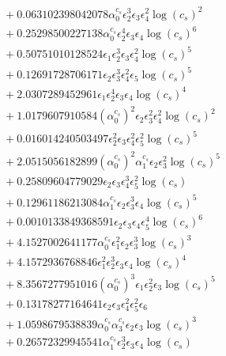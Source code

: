 \documentclass[10pt]{article}
\begin{document}
\begin{align*}
&{}  + 0.063102398042078 \alpha_{0}^{c_s} \epsilon_{2}^{3} \epsilon_{3} \epsilon_{4}^{2} \log{\left(c_{s} \right)}^{2} \\
&{}  + 0.25298500227138 \alpha_{0}^{c_s} \epsilon_{2}^{4} \epsilon_{3} \epsilon_{4} \log{\left(c_{s} \right)}^{6} \\
&{}  + 0.50751010128524 \epsilon_{1} \epsilon_{2}^{3} \epsilon_{3} \epsilon_{4}^{2} \log{\left(c_{s} \right)}^{5} \\
&{}  + 0.12691728706171 \epsilon_{2} \epsilon_{3}^{3} \epsilon_{4}^{2} \epsilon_{5} \log{\left(c_{s} \right)}^{5} \\
&{}  + 2.0307289452961 \epsilon_{1} \epsilon_{2}^{4} \epsilon_{3} \epsilon_{4} \log{\left(c_{s} \right)}^{4} \\
&{}  + 1.0179607910584 \left(\alpha_{0}^{c_s}\right)^{2} \epsilon_{2} \epsilon_{3}^{2} \epsilon_{4}^{2} \log{\left(c_{s} \right)}^{2} \\
&{}  + 0.016014240503497 \epsilon_{2}^{2} \epsilon_{3} \epsilon_{4}^{2} \epsilon_{5}^{2} \log{\left(c_{s} \right)}^{5} \\
&{}  + 2.0515056182899 \left(\alpha_{0}^{c_s}\right)^{2} \alpha_{1}^{c_s} \epsilon_{2} \epsilon_{3}^{2} \log{\left(c_{s} \right)}^{5} \\
&{}  + 0.25809604779029 \epsilon_{2} \epsilon_{3} \epsilon_{4}^{3} \epsilon_{5}^{2} \log{\left(c_{s} \right)} \\
&{}  + 0.12961186213084 \alpha_{1}^{c_s} \epsilon_{2} \epsilon_{3}^{3} \epsilon_{4} \log{\left(c_{s} \right)}^{5} \\
&{}  + 0.0010133849368591 \epsilon_{2} \epsilon_{3} \epsilon_{4} \epsilon_{5}^{4} \log{\left(c_{s} \right)}^{6} \\
&{}  + 4.1527002641177 \alpha_{0}^{c_s} \epsilon_{1}^{2} \epsilon_{2} \epsilon_{3}^{3} \log{\left(c_{s} \right)}^{3} \\
&{}  + 4.1572936768846 \epsilon_{1}^{2} \epsilon_{2}^{3} \epsilon_{3} \epsilon_{4} \log{\left(c_{s} \right)}^{4} \\
&{}  + 8.3567277951016 \left(\alpha_{0}^{c_s}\right)^{3} \epsilon_{1} \epsilon_{2}^{2} \epsilon_{3} \log{\left(c_{s} \right)}^{5} \\
&{}  + 0.13178277164641 \epsilon_{2} \epsilon_{3} \epsilon_{4}^{2} \epsilon_{5}^{2} \epsilon_{6} \\
&{}  + 1.0598679538839 \alpha_{0}^{c_s} \alpha_{3}^{c_s} \epsilon_{2} \epsilon_{3} \log{\left(c_{s} \right)}^{3} \\
&{}  + 0.26572329945541 \alpha_{1}^{c_s} \epsilon_{2}^{3} \epsilon_{3} \epsilon_{4} \log{\left(c_{s} \right)} \\

\end{align*}
\end{document}

